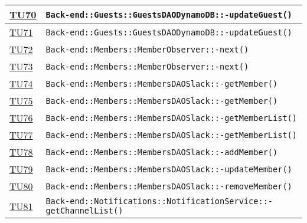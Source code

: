 \begin{longtable}{|>{\centering}m{1cm}|m{12cm}<{\centering}|}
\hyperlink{TU70}{TU70} & \texttt{Back-end::Guests::GuestsDAODynamoDB::-\linebreak updateGuest()}\\ \hline

\hyperlink{TU71}{TU71} & \texttt{Back-end::Guests::GuestsDAODynamoDB::-\linebreak updateGuest()}\\ \hline

\hyperlink{TU72}{TU72} & \texttt{Back-end::Members::MemberObserver::-\linebreak next()}\\ \hline

\hyperlink{TU73}{TU73} & \texttt{Back-end::Members::MemberObserver::-\linebreak next()}\\ \hline

\hyperlink{TU74}{TU74} & \texttt{Back-end::Members::MembersDAOSlack::-\linebreak getMember()}\\ \hline

\hyperlink{TU75}{TU75} & \texttt{Back-end::Members::MembersDAOSlack::-\linebreak getMember()}\\ \hline

\hyperlink{TU76}{TU76} & \texttt{Back-end::Members::MembersDAOSlack::-\linebreak getMemberList()}\\ \hline

\hyperlink{TU77}{TU77} & \texttt{Back-end::Members::MembersDAOSlack::-\linebreak getMemberList()}\\ \hline

\hyperlink{TU78}{TU78} & \texttt{Back-end::Members::MembersDAOSlack::-\linebreak addMember()}\\ \hline

\hyperlink{TU79}{TU79} & \texttt{Back-end::Members::MembersDAOSlack::-\linebreak updateMember()}\\ \hline

\hyperlink{TU80}{TU80} & \texttt{Back-end::Members::MembersDAOSlack::-\linebreak removeMember()}\\ \hline

\hyperlink{TU81}{TU81} & \texttt{Back-end::Notifications::NotificationService::-\linebreak getChannelList()}\\ \hline


\end{longtable}
